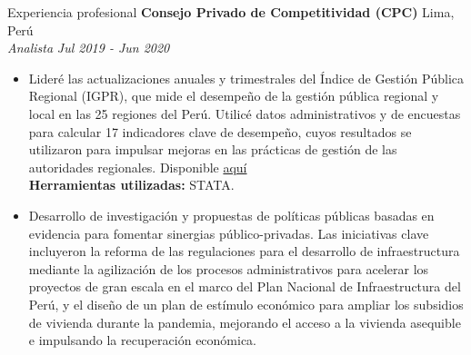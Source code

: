 \documentclass{resume} %
\begin{document}
\begin{rSection}{Experiencia profesional}
     \textbf{Consejo Privado de Competitividad (CPC)} \hfill Lima, Perú\\
     \textit{Analista} \hfill \textit{Jul 2019 - Jun 2020}
     \begin{itemize}
        \itemsep -3pt {} 
         \item Lideré las actualizaciones anuales y trimestrales del Índice de Gestión Pública Regional (IGPR), que mide el desempeño de la gestión pública regional y local en las 25 regiones del Perú. Utilicé datos administrativos y de encuestas para calcular 17 indicadores clave de desempeño, cuyos resultados se utilizaron para impulsar mejoras en las prácticas de gestión de las autoridades regionales. Disponible \href{https://www.compite.pe/wp-content/uploads/2020/07/IRGP-2020-version-final.pdf}{aquí} \\ \textbf{Herramientas utilizadas:} STATA.
         \item Desarrollo de investigación y propuestas de políticas públicas basadas en evidencia para fomentar sinergias público-privadas. Las iniciativas clave incluyeron la reforma de las regulaciones para el desarrollo de infraestructura mediante la agilización de los procesos administrativos para acelerar los proyectos de gran escala en el marco del Plan Nacional de Infraestructura del Perú, y el diseño de un plan de estímulo económico para ampliar los subsidios de vivienda durante la pandemia, mejorando el acceso a la vivienda asequible e impulsando la recuperación económica.
     \end{itemize}
    \end{rSection} 
     \pagebreak
\end{document}
